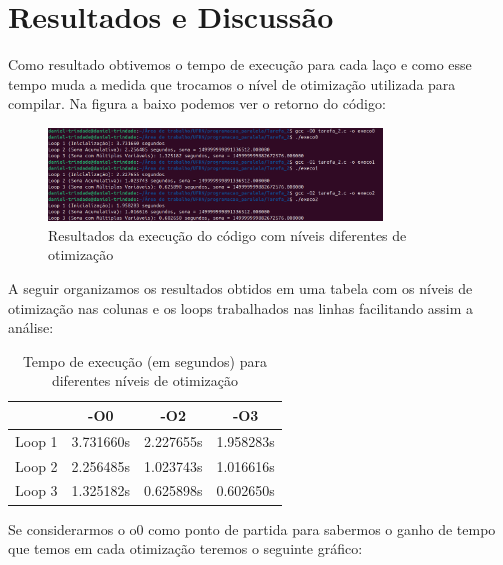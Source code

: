 \documentclass[a4paper, 12pt]{article}
\begin{document}
	\section{Resultados e Discussão}
	
	Como resultado obtivemos o tempo de execução para cada laço e como esse tempo muda a medida que trocamos o nível de otimização utilizada para compilar. Na figura a baixo podemos ver o retorno do código:
	
	\begin{figure}[h]
		\centering
		\includegraphics[width=0.79\textwidth]{resultados.png}
		\caption{Resultados da execução do código com níveis diferentes de otimização}
		\label{figura:exemplo}
	\end{figure}
	
	A seguir organizamos os resultados obtidos em uma tabela com os níveis de otimização nas colunas e os loops trabalhados nas linhas facilitando assim a análise:
	
	\begin{table}[H]
		\centering
		\begin{tabular}{|c|c|c|c|}
			\hline
			\textbf{} & \textbf{-O0} & \textbf{-O2} & \textbf{-O3} \\
			\hline
			Loop 1 & 3.731660s & 2.227655s & 1.958283s \\
			\hline
			Loop 2 & 2.256485s & 1.023743s & 1.016616s \\
			\hline
			Loop 3 & 1.325182s & 0.625898s & 0.602650s \\
			\hline
		\end{tabular}
		\caption{Tempo de execução (em segundos) para diferentes níveis de otimização}
		\label{tab:resultados}
	\end{table}
	
	Se considerarmos o o0 como ponto de partida para sabermos o ganho de tempo que temos em cada otimização teremos o seguinte gráfico:
	
\end{document}
